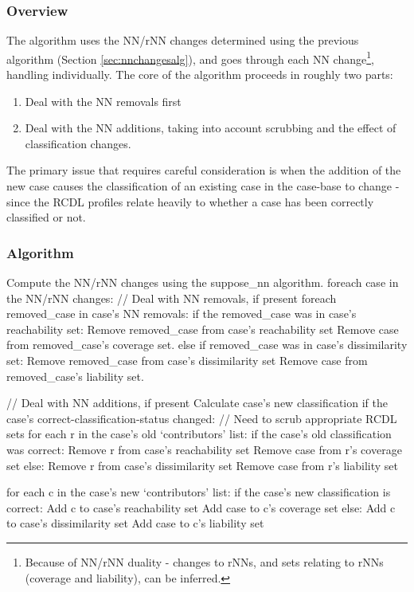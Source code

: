 \documentclass[a4paper,11pt]{report}
\begin{document}
\subsubsection{Overview}
The algorithm uses the NN/rNN changes determined using the previous algorithm (Section \ref{sec:nnchangesalg}), and goes through each NN change\footnote{Because of NN/rNN duality - changes to rNNs, and sets relating to rNNs (coverage and liability), can be inferred.}, handling individually. The core of the algorithm proceeds in roughly two parts:
\begin{enumerate}
	\item Deal with the NN removals first
	\item Deal with the NN additions, taking into account scrubbing and the effect of classification changes.
\end{enumerate}

The primary issue that requires careful consideration is when the addition of the new case causes the classification of an existing case in the case-base to change - since the RCDL profiles relate heavily to whether a case has been correctly classified or not.

\newpage
\subsubsection{Algorithm} \nopagebreak[4]
\begin{code}
Compute the NN/rNN changes using the suppose_nn algorithm.
foreach case in the NN/rNN changes:
  // Deal with NN removals, if present
  foreach removed_case in case's NN removals:
    if the removed_case was in case's reachability set:
      Remove removed_case from case's reachability set
      Remove case from removed_case's coverage set.
    else if removed_case was in case's dissimilarity set:
      Remove removed_case from case's dissimilarity set
      Remove case from removed_case's liability set.

  // Deal with NN additions, if present  
  Calculate case's new classification
  if the case's correct-classification-status changed:
    // Need to scrub appropriate RCDL sets
    for each r in the case's old `contributors' list:
      if the case's old classification was correct:
        Remove r from case's reachability set
        Remove case from r's coverage set
      else:
        Remove r from case's dissimilarity set
        Remove case from r's liability set
        
  for each c in the case's new `contributors' list:
    if the case's new classification is correct:
      Add c to case's reachability set
      Add case to c's coverage set
    else:
      Add c to case's dissimilarity set
      Add case to c's liability set
\end{code}
\end{document}
